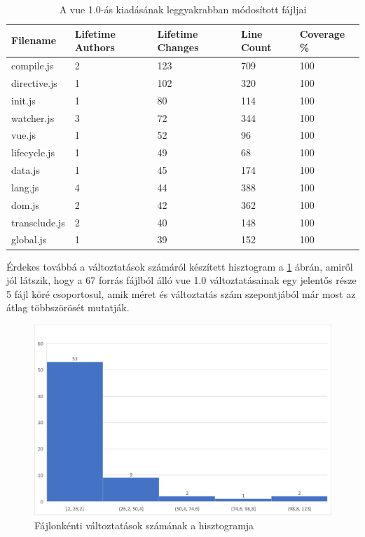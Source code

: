 \begin{table}[h]
    \centering
    \begin{tabular}{l|l|l|l|l}
        Filename      & Lifetime Authors & Lifetime Changes & Line Count & Coverage \% \\ \hline
        compile.js    & 2                & 123              & 709        & 100         \\
        directive.js  & 1                & 102              & 320        & 100         \\
        init.js       & 1                & 80               & 114        & 100         \\
        watcher.js    & 3                & 72               & 344        & 100         \\
        vue.js        & 1                & 52               & 96         & 100         \\
        lifecycle.js  & 1                & 49               & 68         & 100         \\
        data.js       & 1                & 45               & 174        & 100         \\
        lang.js       & 4                & 44               & 388        & 100         \\
        dom.js        & 2                & 42               & 362        & 100         \\
        transclude.js & 2                & 40               & 148        & 100         \\
        global.js     & 1                & 39               & 152        & 100
    \end{tabular}
    \caption{A vue 1.0-ás kiadásának leggyakrabban módosított fájljai} \label{table:vue1-top-files}
\end{table}

Érdekes továbbá a változtatások számáról készített hisztogram a \ref{fig:vue1-hist} ábrán, amiről jól látszik, hogy a 67 forrás fájlból álló vue 1.0 változtatásainak egy jelentős része 5 fájl köré csoportosul, amik méret és változtatás szám szepontjából már most az átlag többszörösét mutatják.

\begin{figure}[h]
    \centering
    \includegraphics[width=1\textwidth]{images/vue/vue1-hist.png}
    \caption{Fájlonkénti változtatások számának a hisztogramja}
    \label{fig:vue1-hist}
\end{figure}

